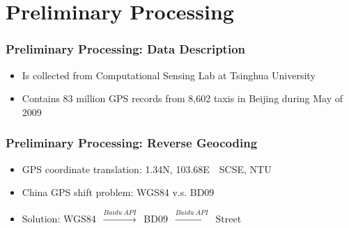\documentclass{beamer}
\theoremstyle{definition}
\begin{document}
\section{Preliminary Processing}
\begin{frame}
\frametitle{Preliminary Processing: Data Description}

\begin{itemize}
	\item Is collected from Computational Sensing Lab at Tsinghua University
	\item Contains 83 million GPS records from 8,602 taxis in Beijing during May of 2009
\end{itemize}

\begin{table}[h!]
\centering
{}
\caption{A summary of the seven original fields}\label{Ta:orig_field}
\end{table}
\end{frame}

\begin{frame}
\frametitle{Preliminary Processing: Reverse Geocoding}
\begin{itemize}
	\item <1-> GPS coordinate translation: 1.34\textdegree N, 103.68\textdegree E~\textrightarrow~SCSE, NTU
	\item <2-> China GPS shift problem: WGS84 v.s. BD09
	\item <3-> Solution: WGS84~$\xrightarrow{Baidu\ API}$~BD09~$\xrightarrow{Baidu\ API}$~Street
\end{itemize}
\end{frame}
\end{document}
